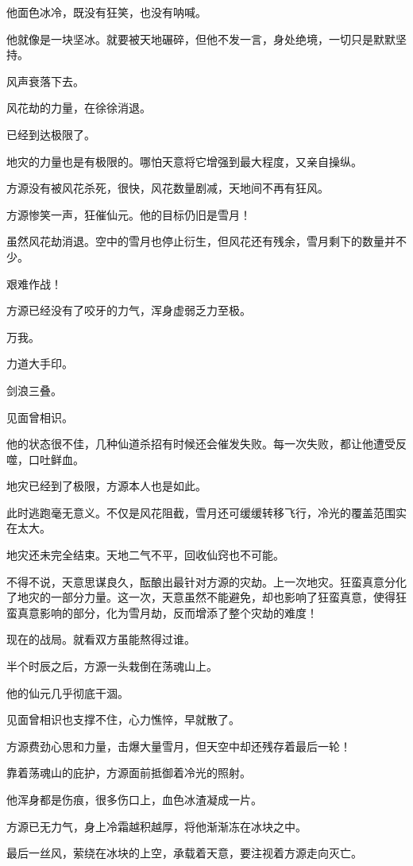 \begin{this_body}
他面色冰冷，既没有狂笑，也没有呐喊。

他就像是一块坚冰。就要被天地碾碎，但他不发一言，身处绝境，一切只是默默坚持。

风声衰落下去。

风花劫的力量，在徐徐消退。

已经到达极限了。

地灾的力量也是有极限的。哪怕天意将它增强到最大程度，又亲自操纵。

方源没有被风花杀死，很快，风花数量剧减，天地间不再有狂风。

方源惨笑一声，狂催仙元。他的目标仍旧是雪月！

虽然风花劫消退。空中的雪月也停止衍生，但风花还有残余，雪月剩下的数量并不少。

艰难作战！

方源已经没有了咬牙的力气，浑身虚弱乏力至极。

万我。

力道大手印。

剑浪三叠。

见面曾相识。

他的状态很不佳，几种仙道杀招有时候还会催发失败。每一次失败，都让他遭受反噬，口吐鲜血。

地灾已经到了极限，方源本人也是如此。

此时逃跑毫无意义。不仅是风花阻截，雪月还可缓缓转移飞行，冷光的覆盖范围实在太大。

地灾还未完全结束。天地二气不平，回收仙窍也不可能。

不得不说，天意思谋良久，酝酿出最针对方源的灾劫。上一次地灾。狂蛮真意分化了地灾的一部分力量。这一次，天意虽然不能避免，却也影响了狂蛮真意，使得狂蛮真意影响的部分，化为雪月劫，反而增添了整个灾劫的难度！

现在的战局。就看双方虽能熬得过谁。

半个时辰之后，方源一头栽倒在荡魂山上。

他的仙元几乎彻底干涸。

见面曾相识也支撑不住，心力憔悴，早就散了。

方源费劲心思和力量，击爆大量雪月，但天空中却还残存着最后一轮！

靠着荡魂山的庇护，方源面前抵御着冷光的照射。

他浑身都是伤痕，很多伤口上，血色冰渣凝成一片。

方源已无力气，身上冷霜越积越厚，将他渐渐冻在冰块之中。

最后一丝风，萦绕在冰块的上空，承载着天意，要注视着方源走向灭亡。


\end{this_body}
